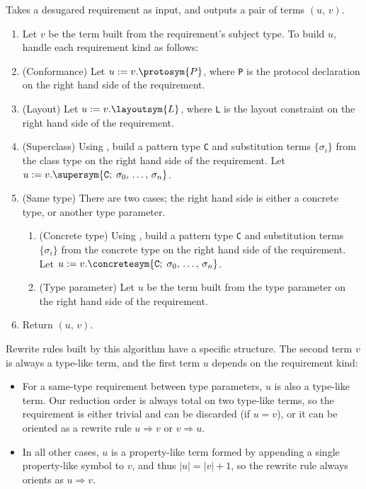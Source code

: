\documentclass[../generics]{subfiles}
\begin{document}
\begin{algorithm}\label{build rule}
Takes a desugared requirement as input, and outputs a pair of terms $(u,\,v)$.
\begin{enumerate}
\item Let $v$ be the term built from the requirement's subject type. To build $u$, handle each requirement kind as follows:
%
\item (Conformance) Let $u := v.\protosym{P}$, where \texttt{P} is the protocol declaration on the right hand side of the requirement.
%
\item (Layout) Let $u := v.\layoutsym{L}$, where \texttt{L} is the layout constraint on the right hand side of the requirement.
%
\item (Superclass) Using , build a pattern type \texttt{C} and substitution terms $\{\sigma_i\}$ from the class type on the right hand side of the requirement. Let $u := v.\supersym{\texttt{C};\;\sigma_0,\,\ldots,\,\sigma_n}$.
%
\item (Same type) There are two cases; the right hand side is either a concrete type, or another type parameter.
\begin{enumerate}
\item (Concrete type) Using , build a pattern type \texttt{C} and substitution terms $\{\sigma_i\}$ from the concrete type on the right hand side of the requirement. Let $u := v.\concretesym{\texttt{C};\;\sigma_0,\,\ldots,\,\sigma_n}$.
\item (Type parameter) Let $u$ be the term built from the type parameter on the right hand side of the requirement.
\end{enumerate}
\item Return $(u,\,v)$.
\end{enumerate}
\end{algorithm}
Rewrite rules built by this algorithm have a specific structure. The second term $v$ is always a type-like term, and the first term $u$ depends on the requirement kind:
\begin{itemize}
\item For a same-type requirement between type parameters, $u$ is also a type-like term. Our reduction order is always total on two type-like terms, so the requirement is either trivial and can be discarded (if $u=v$), or it can be oriented as a rewrite rule $u\Rightarrow v$ or $v\Rightarrow u$.
\item In all other cases, $u$ is a property-like term formed by appending a single property-like symbol to $v$, and thus $|u|=|v|+1$, so the rewrite rule always orients as $u\Rightarrow v$.
\end{itemize}
\end{document}
